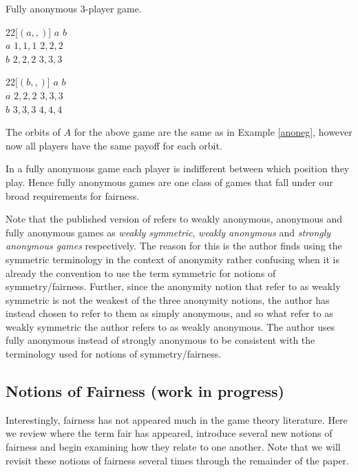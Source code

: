 \begin{example}
		Fully anonymous 3-player game.
		\begin{center}
		\begin{game}{2}{2}[$(a,,)$]
			      \> $a$      \> $b$ \\
			$a$   \> $1,1,1$  \> $2,2,2$ \\
			$b$   \> $2,2,2$  \> $3,3,3$
		\end{game}
		\hspace*{10mm} 
		\begin{game}{2}{2}[$(b,,)$]
			      \> $a$     \> $b$ \\
			$a$   \> $2,2,2$ \> $3,3,3$ \\
			$b$   \> $3,3,3$ \> $4,4,4$
		\end{game}
		\end{center}
		The orbits of $A$ for the above game are the same as in Example \ref{anoneg}, however now all players have the same payoff for each orbit.
	\end{example}
	
In a fully anonymous game each player is indifferent between which position they play. Hence fully anonymous games are one class of games that fall under our broad requirements for fairness. 

Note that the published version of \cite{brandt2009symmetries} refers to weakly anonymous, anonymous and fully anonymous games as \textit{weakly symmetric}, \textit{weakly anonymous} and \textit{strongly anonymous games} respectively. The reason for this is the author finds using the symmetric terminology in the context of anonymity rather confusing when it is already the convention to use the term symmetric for notions of symmetry/fairness. Further, since the anonymity notion that \cite{brandt2009symmetries} refer to as weakly symmetric is not the weakest of the three anonymity notions, the author has instead chosen to refer to them as simply anonymous, and so what \cite{brandt2009symmetries} refer to as weakly symmetric the author refers to as weakly anonymous. The author uses fully anonymous instead of strongly anonymous to be consistent with the terminology used for notions of symmetry/fairness.

\subsection{Notions of Fairness (work in progress)} \label{subsec:labeldepnotionsoffairness}
Interestingly, fairness has not appeared much in the game theory literature. Here we review where the term fair has appeared, introduce several new notions of fairness and begin examining how they relate to one another. Note that we will revisit these notions of fairness several times through the remainder of the paper.

